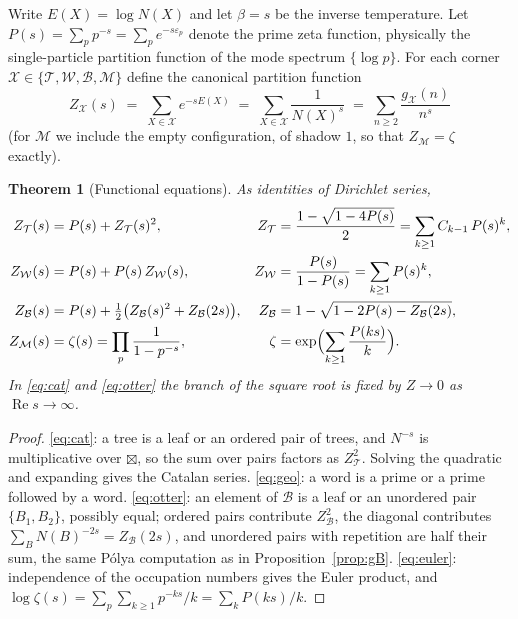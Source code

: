 \documentclass[11pt]{article}
\newcommand{\cT}{\mathcal{T}}   %
\newcommand{\cW}{\mathcal{W}}   %
\newcommand{\cB}{\mathcal{B}}   %
\newcommand{\cM}{\mathcal{M}}   %
\numberwithin{equation}{section}
\theoremstyle{plain}
\newtheorem{theorem}{Theorem}[section]
\theoremstyle{definition}
\theoremstyle{remark}
\begin{document}
Write $E(X) = \log N(X)$ and let $\beta = s$ be the inverse temperature. Let
$P(s) = \sum_p p^{-s} = \sum_p e^{-s\varepsilon_p}$ denote the prime zeta function,
physically the single-particle partition function of the mode spectrum
$\{\log p\}$. For each corner
$\mathcal{X} \in \{\cT, \cW, \cB, \cM\}$ define the canonical partition function
\[
Z_{\mathcal X}(s) \;=\; \sum_{X \in \mathcal X} e^{-s E(X)}
\;=\; \sum_{X \in \mathcal X} \frac{1}{N(X)^{s}}
\;=\; \sum_{n \ge 2} \frac{g_{\mathcal X}(n)}{n^{s}}
\]
(for $\cM$ we include the empty configuration, of shadow $1$, so that
$Z_\cM = \zeta$ exactly).

\begin{theorem}[Functional equations]\label{thm:funceq}
As identities of Dirichlet series,
\begin{align}
Z_\cT(s) &= P(s) + Z_\cT(s)^2,
& Z_\cT &= \frac{1 - \sqrt{1 - 4P(s)}}{2} = \sum_{k\ge1} C_{k-1}\,P(s)^k,
\label{eq:cat}\\
Z_\cW(s) &= P(s) + P(s)\,Z_\cW(s),
& Z_\cW &= \frac{P(s)}{1-P(s)} = \sum_{k \ge 1} P(s)^k,
\label{eq:geo}\\
Z_\cB(s) &= P(s) + \tfrac12\bigl(Z_\cB(s)^2 + Z_\cB(2s)\bigr),
& Z_\cB &= 1 - \sqrt{1 - 2P(s) - Z_\cB(2s)},
\label{eq:otter}\\
Z_\cM(s) &= \zeta(s) = \prod_p \frac{1}{1-p^{-s}},
& \zeta &= \exp\Bigl(\sum_{k \ge 1} \frac{P(ks)}{k}\Bigr).
\label{eq:euler}
\end{align}
In \eqref{eq:cat} and \eqref{eq:otter} the branch of the square root is fixed by
$Z \to 0$ as $\operatorname{Re} s \to \infty$.
\end{theorem}

\begin{proof}
\eqref{eq:cat}: a tree is a leaf or an ordered pair of trees, and $N^{-s}$ is
multiplicative over $\boxtimes$, so the sum over pairs factors as $Z_\cT^2$. Solving
the quadratic and expanding gives the Catalan series.
\eqref{eq:geo}: a word is a prime or a prime followed by a word.
\eqref{eq:otter}: an element of $\cB$ is a leaf or an unordered pair
$\{B_1,B_2\}$, possibly equal; ordered pairs contribute $Z_\cB^2$, the diagonal
contributes $\sum_B N(B)^{-2s} = Z_\cB(2s)$, and unordered pairs with repetition are
half their sum, the same P\'olya computation as in Proposition~\ref{prop:gB}.
\eqref{eq:euler}: independence of the occupation numbers gives the Euler product, and
$\log \zeta(s) = \sum_p \sum_{k\ge1} p^{-ks}/k = \sum_k P(ks)/k$.
\end{proof}
\end{document}
